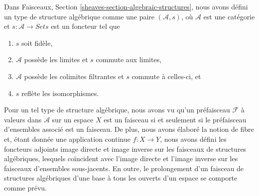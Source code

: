 \noindent
Dans Faisceaux, Section \ref{sheaves-section-algebraic-structures},
nous avons défini un type de structure algébrique comme une paire
$(\mathcal{A}, s)$, où $\mathcal{A}$ est une catégorie
et $s : \mathcal{A} \to \textit{Sets}$ est un foncteur tel
que
\begin{enumerate}
\item $s$ soit fidèle,
\item $\mathcal{A}$ possède les limites et $s$ commute aux limites,
\item $\mathcal{A}$ possède les colimites filtrantes et $s$ commute à celles-ci, et
\item $s$ reflète les isomorphismes.
\end{enumerate}
Pour un tel type de structure algébrique, nous avons vu qu'un préfaisceau
$\mathcal{F}$ à valeurs dans $\mathcal{A}$ sur un espace $X$ est un faisceau si et
seulement si le préfaisceau d'ensembles associé est un faisceau. De plus,
nous avons élaboré la notion de fibre et, étant donnée une application continue
$f : X \to Y$, nous avons défini les foncteurs adjoints image directe et image inverse
sur les faisceaux de structures algébriques, lesquels coïncident avec l'image directe
et l'image inverse sur les faisceaux d'ensembles sous-jacents. En outre, le prolongement
d'un faisceau de structures algébriques d'une base à tous les ouverts
d'un espace se comporte comme prévu.

